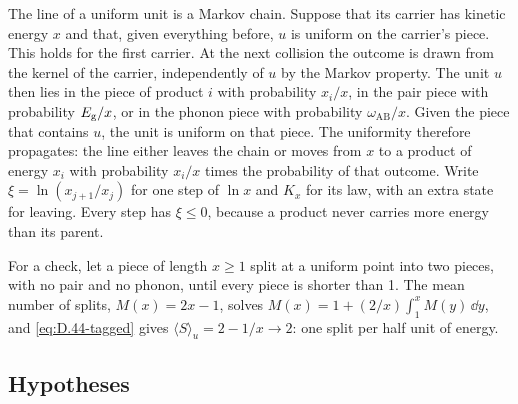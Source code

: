 The line of a uniform unit is a Markov chain. Suppose that its carrier has kinetic energy $x$ and that, given everything before, $u$ is uniform on the carrier's piece. This holds for the first carrier. At the next collision the outcome is drawn from the kernel of the carrier, independently of $u$ by the Markov property. The unit $u$ then lies in the piece of product $i$ with probability $x_i/x$, in the pair piece with probability $E_{\mathrm{g}}/x$, or in the phonon piece with probability $\omega_{\mathrm{AB}}/x$. Given the piece that contains $u$, the unit is uniform on that piece. The uniformity therefore propagates: the line either leaves the chain or moves from $x$ to a product of energy $x_i$ with probability $x_i/x$ times the probability of that outcome. Write $\xi = \ln(x_{j+1}/x_j)$ for one step of $\ln x$ and $K_x$ for its law, with an extra state for leaving. Every step has $\xi \le 0$, because a product never carries more energy than its parent.

For a check, let a piece of length $x \ge 1$ split at a uniform point into two pieces, with no pair and no phonon, until every piece is shorter than 1. The mean number of splits, $M(x) = 2x - 1$, solves $M(x) = 1 + (2/x)\int_1^xM(y)\,\dd y$, and \cref{eq:D.44-tagged} gives $\langle S\rangle_u = 2 - 1/x \to 2$: one split per half unit of energy.

\subsection{Hypotheses}


